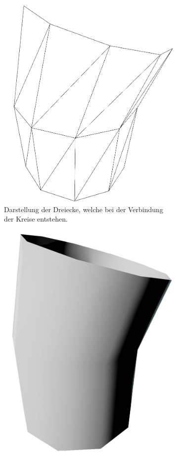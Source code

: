 \begin{figure} [hbtp]
	\centering
	\begin{subfigure}[t]{.4\textwidth}
		\centering
		\includegraphics[height=\linewidth]{images/MultiZylinder10SegmenteWireframe.png}
		\caption{Darstellung der Dreiecke, welche bei der Verbindung der Kreise entstehen.}
		\label{subfig:MultiZylinder10SegmenteWireframe}
	\end{subfigure}
	\hspace{.1\textwidth}
	\begin{subfigure}[t]{.4\textwidth}
		\centering
		\includegraphics[height=\linewidth]{images/MultiZylinder10SegmenteOpaque.png}

\end{subfigure}
\end{figure}
